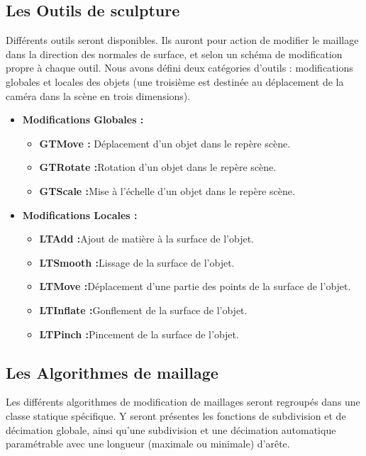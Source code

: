 \documentclass[a4paper]{memoir}
\begin{document}
			\subsection{Les Outils de sculpture}
				\label{tool-cdc}
				Différents outils seront disponibles. Ils auront pour action de modifier le maillage dans la direction des normales de surface, et selon
				un schéma de modification propre à chaque outil. Nous avons défini deux catégories d'outils : modifications globales et locales des objets
				(une troisième est destinée au déplacement de la caméra dans la scène en trois dimensions).
				\newpage
				\begin{itemize}
					\item \textbf{Modifications Globales :}
					\begin{itemize}
						\item \textbf{GTMove :} Déplacement d'un objet dans le repère scène.
						\item \textbf{GTRotate :}Rotation d'un objet dans le repère scène.
						\item \textbf{GTScale :}Mise à l'échelle d'un objet dans le repère scène.
					\end{itemize}
					\item \textbf{Modifications Locales :}
					\begin{itemize}
						\item \textbf{LTAdd :}Ajout de matière à la surface de l'objet.
						\item \textbf{LTSmooth :}Lissage de la surface de l'objet.
						\item \textbf{LTMove :}Déplacement d'une partie des points de la surface de l'objet.
						\item \textbf{LTInflate :}Gonflement de la surface de l'objet.
						\item \textbf{LTPinch :}Pincement de la surface de l'objet.
					\end{itemize}
				\end{itemize}

			\subsection{Les Algorithmes de maillage}
				Les différents algorithmes de modification de maillages seront regroupés dans une classe statique spécifique. Y seront présentes les 
				fonctions de subdivision et de décimation globale, ainsi qu'une subdivision et une décimation automatique paramétrable avec une longueur 
				(maximale ou minimale) d'arête.
\end{document}
